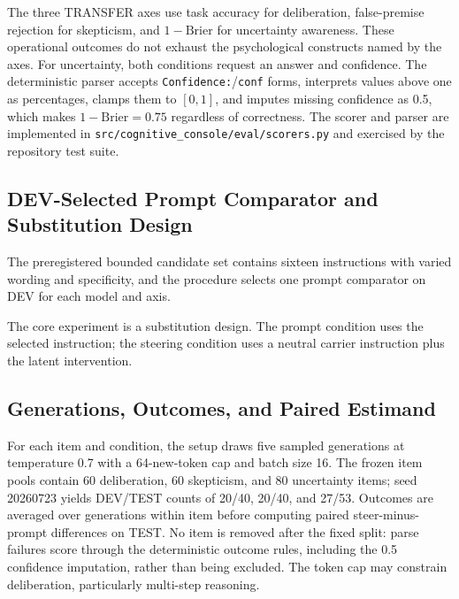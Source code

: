\documentclass[manuscript,review,anonymous]{acmart}
\begin{document}
The three TRANSFER axes use task accuracy for deliberation, false-premise rejection for skepticism, and \(1-\mathrm{Brier}\) for uncertainty awareness. {}%
These operational outcomes do not exhaust the psychological constructs named by the axes. For uncertainty, both conditions request an answer and confidence. The deterministic parser accepts \texttt{Confidence:}/\texttt{conf} forms, interprets values above one as percentages, clamps them to \([0,1]\), and imputes missing confidence as 0.5, which makes \(1-\mathrm{Brier}=0.75\) regardless of correctness. {}%
{}%
The scorer and parser are implemented in \texttt{src/cognitive\_console/eval/scorers.py} and exercised by the repository test suite.

\subsection{DEV-Selected Prompt Comparator and Substitution Design}\label{dev-selected-prompt-comparator-and-substitution-design}

The preregistered bounded candidate set contains sixteen instructions with varied wording and specificity, and the procedure selects one prompt comparator on DEV for each model and axis. {}%
{}%

The core experiment is a substitution design. The prompt condition uses the selected instruction; the steering condition uses a neutral carrier instruction plus the latent intervention. {}%
{}%

\subsection{Generations, Outcomes, and Paired Estimand}\label{generations-outcomes-and-paired-estimand}

For each item and condition, the setup draws five sampled generations at temperature 0.7 with a 64-new-token cap and batch size 16. {}%
The frozen item pools contain 60 deliberation, 60 skepticism, and 80 uncertainty items; seed 20260723 yields DEV/TEST counts of 20/40, 20/40, and 27/53. Outcomes are averaged over generations within item before computing paired steer-minus-prompt differences on TEST. {}%
No item is removed after the fixed split: parse failures score through the deterministic outcome rules, including the 0.5 confidence imputation, rather than being excluded. The token cap may constrain deliberation, particularly multi-step reasoning. {}%
\end{document}
